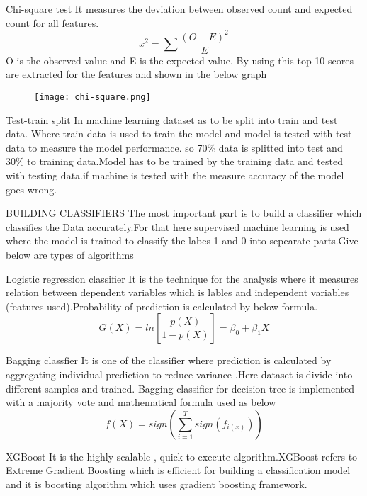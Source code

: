\documentclass{beamer}
\begin{document}
\begin{frame}{Chi-square test}
It measures the deviation between observed count and expected count for all features. 
$$x^{2}=\sum \frac{(O-E)^{2}}{E}$$
O is the observed value and E is the expected value.
By using this top 10 scores are extracted for the features and shown in the below graph
\begin{figure}[ht]
    \centering
    \texttt{[image: chi-square.png]}
\end{figure}
    
\end{frame}
\begin{frame}{Test-train split}
In machine learning dataset as to be split into train and test 
data. Where train data is used to train the model and model is 
tested with test data to measure the model performance.
so 70\% data is splitted into  test and 30\% to training data.Model has to be trained by the training data and tested with testing data.if machine is tested with the measure accuracy of the model goes wrong.
\end{frame}
\begin{frame}{BUILDING CLASSIFIERS}
The most important part is to build a classifier which classifies the Data accurately.For that here supervised machine learning is used where the model is trained to classify the labes 1 and 0 into sepearate parts.Give below are types of algorithms 
\begin{block}{Logistic regression classifier}
It is the technique for the analysis where it measures relation between dependent variables which is lables and independent variables (features used).Probability of prediction is calculated by below formula.
$$G(X)=ln  \left[\frac{p(X)}{1-p(X)}\right]=\beta_{0}+\beta_{1}X$$
\end{block}
\end{frame}
\begin{frame}
    \begin{block}{Bagging classfier}
It is one of the classifier where  prediction is calculated by aggregating individual prediction to reduce variance .Here dataset is divide into different samples and trained. Bagging classifier for decision tree is implemented with a majority vote and 
mathematical formula used as below
$$f(X)=sign\left(\sum_{i=1}^{T}sign(f_{i(x)})\right)$$
\end{block}
\begin{block}{XGBoost}
It is the highly scalable , quick to execute algorithm.XGBoost refers to Extreme Gradient Boosting which is efficient for building a classification model and it is boosting algorithm which uses gradient boosting framework. 
\end{block}
\end{frame}
\end{document}
